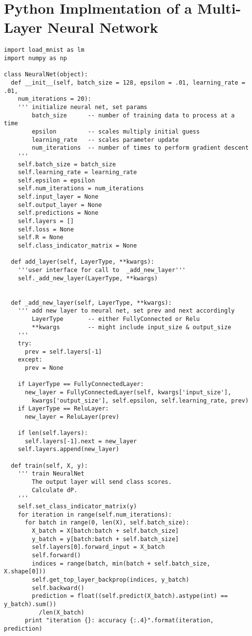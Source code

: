 \newpage
\section{Python Implmentation of a Multi-Layer Neural Network}
\begin{verbatim}
import load_mnist as lm
import numpy as np

class NeuralNet(object):
  def __init__(self, batch_size = 128, epsilon = .01, learning_rate = .01,
    num_iterations = 20):
    ''' initialize neural net, set params
        batch_size      -- number of training data to process at a time
        epsilon         -- scales multiply initial guess
        learning_rate   -- scales parameter update
        num_iterations  -- number of times to perform gradient descent
    '''
    self.batch_size = batch_size
    self.learning_rate = learning_rate
    self.epsilon = epsilon
    self.num_iterations = num_iterations
    self.input_layer = None
    self.output_layer = None
    self.predictions = None
    self.layers = []
    self.loss = None
    self.R = None
    self.class_indicator_matrix = None

  def add_layer(self, LayerType, **kwargs):
    '''user interface for call to  _add_new_layer'''
    self._add_new_layer(LayerType, **kwargs)


  def _add_new_layer(self, LayerType, **kwargs):
    ''' add new layer to neural net, set prev and next accordingly
        LayerType       -- either FullyConnected or Relu
        **kwargs        -- might include input_size & output_size
    '''
    try:
      prev = self.layers[-1]
    except:
      prev = None

    if LayerType == FullyConnectedLayer:
      new_layer = FullyConnectedLayer(self, kwargs['input_size'],
        kwargs['output_size'], self.epsilon, self.learning_rate, prev)
    if LayerType == ReluLayer:
      new_layer = ReluLayer(prev)

    if len(self.layers):
      self.layers[-1].next = new_layer
    self.layers.append(new_layer)

  def train(self, X, y):
    ''' train NeuralNet
        The output layer will send class scores.
        Calculate dP.
    '''
    self.set_class_indicator_matrix(y)
    for iteration in range(self.num_iterations):
      for batch in range(0, len(X), self.batch_size):
        X_batch = X[batch:batch + self.batch_size]
        y_batch = y[batch:batch + self.batch_size]
        self.layers[0].forward_input = X_batch
        self.forward()
        indices = range(batch, min(batch + self.batch_size, X.shape[0]))
        self.get_top_layer_backprop(indices, y_batch)
        self.backward()
        prediction = float((self.predict(X_batch).astype(int) == y_batch).sum())
          /len(X_batch)
      print "iteration {}: accuracy {:.4}".format(iteration, prediction)
 

\end{verbatim}
